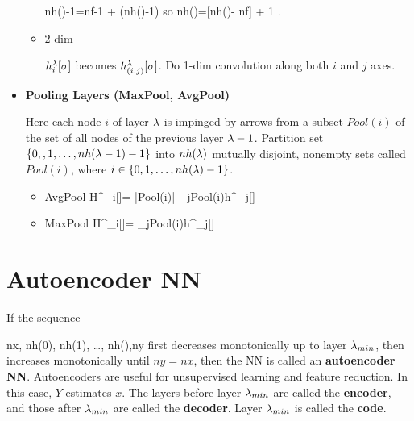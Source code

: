 \begin{itemize}
\begin{itemize}
\beq
nh()-1=nf-1 +
(nh(\lam)-1)\sigma
\;
\eeq
so
\beq
nh(\lam)=[nh()-
nf] + 1
\;.
\eeq
\item 2-dim

$h_i^\lambda[\sigma]$ becomes
$h_{(i,j)}^\lambda[\sigma]$.
Do 1-dim convolution
along both $i$ and $j$ axes.

\end{itemize}
\item{\bf Pooling Layers
(MaxPool, AvgPool)}

Here each node $i$
of layer $\lambda$ is impinged by
arrows from  a subset $Pool(i)$
of the set of all
nodes of the previous layer $\lambda-1$.
Partition set
$\{0,,1,\dots,nh(\lambda-1)-1\}
$ into $nh(\lambda)$ mutually
disjoint, nonempty sets
called $Pool(i)$, where
$i\in \{0, 1, \ldots,nh(\lambda)-1\}$.

\begin{itemize}
\item AvgPool
\beq
H^\lam_i[\sigma]=
{|Pool(i)|}
\sum_{j\in Pool(i)}h^{}_j[\sigma]
\eeq
\item MaxPool
\beq
H^\lam_i[\sigma]=
\max_{j\in Pool(i)}h^{}_j[\sigma]
\eeq

\end{itemize}


\end{itemize}

\section{Autoencoder NN}


If the sequence

\beq
nx, nh(0), nh(1), \ldots,
nh(),ny
\eeq
first decreases monotonically
up to layer $\lambda_{min}$, then
increases monotonically until
$ny=nx$, then
the NN is called an {\bf
autoencoder NN}.
Autoencoders
are  useful for unsupervised learning
and
feature reduction. In this case,
$Y$ estimates $x$.
The layers before
layer $\lambda_{min}$
are called the {\bf encoder},
and those after
$\lambda_{min}$ are called the
{\bf decoder}.
Layer $\lambda_{min}$
is called the {\bf code}.

